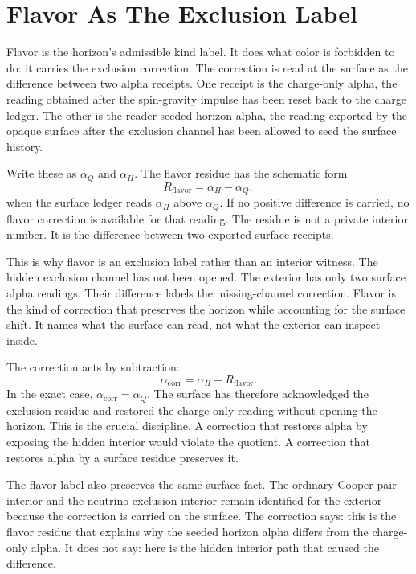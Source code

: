 \section{Flavor As The Exclusion Label}

Flavor is the horizon's admissible kind label. It does what color is
forbidden to do: it carries the exclusion correction. The correction is read
at the surface as the difference between two alpha receipts. One receipt is
the charge-only alpha, the reading obtained after the spin-gravity impulse
has been reset back to the charge ledger. The other is the reader-seeded
horizon alpha, the reading exported by the opaque surface after the
exclusion channel has been allowed to seed the surface history.

Write these as \(\alpha_Q\) and \(\alpha_H\). The flavor residue has the
schematic form
\[
  R_{\mathrm{flavor}} = \alpha_H - \alpha_Q,
\]
when the surface ledger reads \(\alpha_H\) above \(\alpha_Q\). If no
positive difference is carried, no flavor correction is available for that
reading. The residue is not a private interior number. It is the difference
between two exported surface receipts.

This is why flavor is an exclusion label rather than an interior witness.
The hidden exclusion channel has not been opened. The exterior has only two
surface alpha readings. Their difference labels the missing-channel
correction. Flavor is the kind of correction that preserves the horizon
while accounting for the surface shift. It names what the surface can read,
not what the exterior can inspect inside.

The correction acts by subtraction:
\[
  \alpha_{\mathrm{corr}}
    = \alpha_H - R_{\mathrm{flavor}}.
\]
In the exact case, \(\alpha_{\mathrm{corr}}=\alpha_Q\). The surface has
therefore acknowledged the exclusion residue and restored the charge-only
reading without opening the horizon. This is the crucial discipline. A
correction that restores alpha by exposing the hidden interior would violate
the quotient. A correction that restores alpha by a surface residue
preserves it.

The flavor label also preserves the same-surface fact. The ordinary
Cooper-pair interior and the neutrino-exclusion interior remain identified
for the exterior because the correction is carried on the surface. The
correction says: this is the flavor residue that explains why the seeded
horizon alpha differs from the charge-only alpha. It does not say: here is
the hidden interior path that caused the difference.

